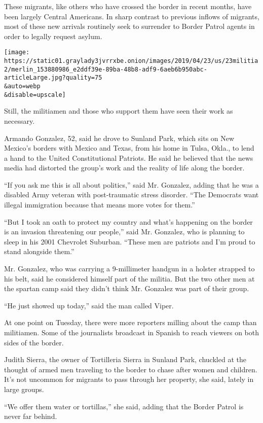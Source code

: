 These migrants, like others who have crossed the border in recent
months, have been largely Central Americans. In sharp contrast to
previous inflows of migrants, most of these new arrivals routinely seek
to surrender to Border Patrol agents in order to legally request asylum.

\texttt{[image: https://static01.graylady3jvrrxbe.onion/images/2019/04/23/us/23militia2/merlin\_153880986\_e2ddf39e-89ba-48b8-adf9-6aeb6b950abc-articleLarge.jpg?quality=75\\\&auto=webp\\\&disable=upscale]}

Still, the militiamen and those who support them have seen their work as
necessary.

Armando Gonzalez, 52, said he drove to Sunland Park, which sits on New
Mexico's borders with Mexico and Texas, from his home in Tulsa, Okla.,
to lend a hand to the United Constitutional Patriots. He said he
believed that the news media had distorted the group's work and the
reality of life along the border.

``If you ask me this is all about politics,'' said Mr. Gonzalez, adding
that he was a disabled Army veteran with post-traumatic stress disorder.
``The Democrats want illegal immigration because that means more votes
for them.''

``But I took an oath to protect my country and what's happening on the
border is an invasion threatening our people,'' said Mr. Gonzalez, who
is planning to sleep in his 2001 Chevrolet Suburban. ``These men are
patriots and I'm proud to stand alongside them.''

Mr. Gonzalez, who was carrying a 9-millimeter handgun in a holster
strapped to his belt, said he considered himself part of the militia.
But the two other men at the spartan camp said they didn't think Mr.
Gonzalez was part of their group.

``He just showed up today,'' said the man called Viper.

At one point on Tuesday, there were more reporters milling about the
camp than militiamen. Some of the journalists broadcast in Spanish to
reach viewers on both sides of the border.

Judith Sierra, the owner of Tortilleria Sierra in Sunland Park, chuckled
at the thought of armed men traveling to the border to chase after women
and children. It's not uncommon for migrants to pass through her
property, she said, lately in large groups.

``We offer them water or tortillas,'' she said, adding that the Border
Patrol is never far behind.

